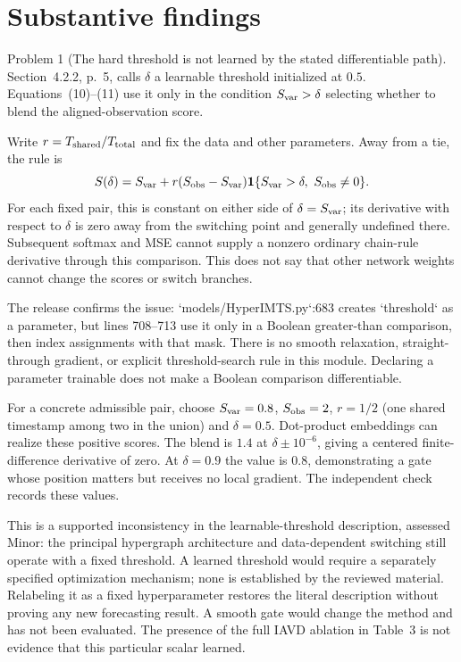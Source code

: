 \documentclass[10pt]{article}
\begin{document}
\section*{Substantive findings}
Problem 1 (The hard threshold is not learned by the stated differentiable path).  Section 4.2.2, p. 5, calls \(\delta\) a learnable threshold initialized at \(0.5\). Equations (10)–(11) use it only in the condition \(S_{\rm var}>\delta\) selecting whether to blend the aligned-observation score.\par
Write \(r=T_{\rm shared}/T_{\rm total}\) and fix the data and other parameters. Away from a tie, the rule is \[S(\delta)=S_{\rm var}+r(S_{\rm obs}-S_{\rm var})
\mathbf1\{S_{\rm var}>\delta,\ S_{\rm obs}\ne0\}.\] For each fixed pair, this is constant on either side of \(\delta=S_{\rm var}\); its derivative with respect to \(\delta\) is zero away from the switching point and generally undefined there. Subsequent softmax and MSE cannot supply a nonzero ordinary chain-rule derivative through this comparison. This does not say that other network weights cannot change the scores or switch branches.\par
The release confirms the issue: `models/HyperIMTS.py`:683 creates `threshold` as a parameter, but lines 708–713 use it only in a Boolean greater-than comparison, then index assignments with that mask. There is no smooth relaxation, straight-through gradient, or explicit threshold-search rule in this module. Declaring a parameter trainable does not make a Boolean comparison differentiable.\par
For a concrete admissible pair, choose \(S_{\rm var}=0.8\), \(S_{\rm obs}=2\), \(r=1/2\) (one shared timestamp among two in the union) and \(\delta=0.5\). Dot-product embeddings can realize these positive scores. The blend is \(1.4\) at \(\delta\pm10^{-6}\), giving a centered finite-difference derivative of zero. At \(\delta=0.9\) the value is \(0.8\), demonstrating a gate whose position matters but receives no local gradient. The independent check records these values.\par
This is a supported inconsistency in the learnable-threshold description, assessed Minor: the principal hypergraph architecture and data-dependent switching still operate with a fixed threshold. A learned threshold would require a separately specified optimization mechanism; none is established by the reviewed material. Relabeling it as a fixed hyperparameter restores the literal description without proving any new forecasting result. A smooth gate would change the method and has not been evaluated. The presence of the full IAVD ablation in Table 3 is not evidence that this particular scalar learned.\par
\end{document}

